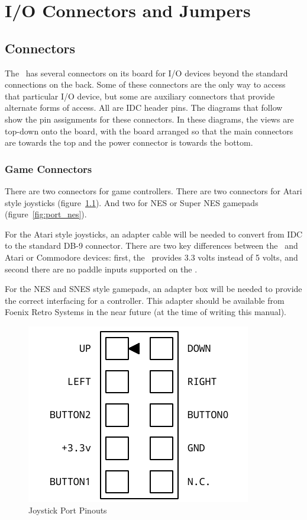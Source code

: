 \chapter{I/O Connectors and Jumpers}

\section*{Connectors}

The \jr\ has several connectors on its board for I/O devices beyond the standard connections on the back. Some of these connectors are the only way to access that particular I/O device, but some are auxiliary connectors that provide alternate forms of access. All are IDC header pins. The diagrams that follow show the pin assignments for these connectors. In these diagrams, the views are top-down onto the board, with the board arranged so that the main connectors are towards the top and the power connector is towards the bottom.

\subsection*{Game Connectors}

There are two connectors for game controllers. There are two connectors for Atari style joysticks (figure~\ref{fig:port_joy}). And two for NES or Super NES gamepads (figure~\ref{fig:port_nes}).

For the Atari style joysticks, an adapter cable will be needed to convert from IDC to the standard DB-9 connector. There are two key differences between the \jr\ and Atari or Commodore devices: first, the \jr\ provides 3.3 volts instead of 5 volts, and second there are no paddle inputs supported on the \jr.

For the NES and SNES style gamepads, an adapter box will be needed to provide the correct interfacing for a controller. This adapter should be available from Foenix Retro Systems in the near future (at the time of writing this manual).

\begin{figure}[ht]
    \begin{center}
        \includegraphics[scale=0.75]{images/f256_port_joystick.pdf}
    \end{center}
    \caption{Joystick Port Pinouts}
    \label{fig:port_joy}
\end{figure}

